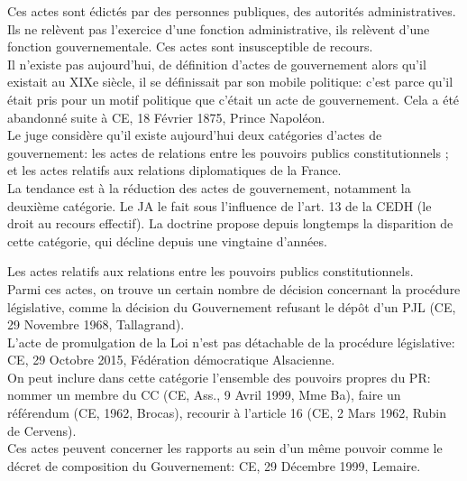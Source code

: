 \documentclass[10pt, a4paper, openany]{book}
\begin{document}
Ces actes sont édictés par des personnes publiques, des autorités administratives. Ils ne relèvent pas l'exercice d'une fonction administrative, ils relèvent d'une fonction gouvernementale. Ces actes sont insusceptible de recours. \\
Il n'existe pas aujourd'hui, de définition d'actes de gouvernement alors qu'il existait au XIXe siècle, il se définissait par son mobile politique: c'est parce qu'il était pris pour un motif politique que c'était un acte de gouvernement. Cela a été abandonné suite à CE, 18 Février 1875, Prince Napoléon. \\
Le juge considère qu'il existe aujourd'hui deux catégories d'actes de gouvernement: les actes de relations entre les pouvoirs publics constitutionnels ; et les actes relatifs aux relations diplomatiques de la France. \\
La tendance est à la réduction des actes de gouvernement, notamment la deuxième catégorie. Le JA le fait sous l'influence de l'art. 13 de la CEDH (le droit au recours effectif). La doctrine propose depuis longtemps la disparition de cette catégorie, qui décline depuis une vingtaine d'années. 


Les actes relatifs aux relations entre les pouvoirs publics constitutionnels. \\
Parmi ces actes, on trouve un certain nombre de décision concernant la procédure législative, comme la décision du Gouvernement refusant le dépôt d'un PJL (CE, 29 Novembre 1968, Tallagrand). \\
L'acte de promulgation de la Loi n'est pas détachable de la procédure législative: CE, 29 Octobre 2015, Fédération démocratique Alsacienne. \\
On peut inclure dans cette catégorie l'ensemble des pouvoirs propres du PR: nommer un membre du CC (CE, Ass., 9 Avril 1999, Mme Ba), faire un référendum (CE, 1962, Brocas), recourir à l'article 16 (CE, 2 Mars 1962, Rubin de Cervens). \\
Ces actes peuvent concerner les rapports au sein d'un même pouvoir comme le décret de composition du Gouvernement: CE, 29 Décembre 1999, Lemaire.
\end{document}
